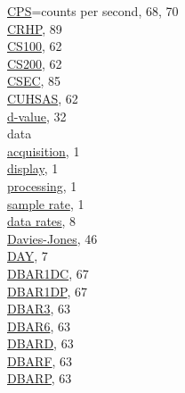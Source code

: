 \documentclass[
]{book}
\begin{document}
\href{./5-cloud-physics-variables.html\#a1dc-a1dp}{CPS}=counts per second, 68, 70\\
\href{./10-obsolete-variables.html\#cryo-hygro}{CRHP}, 89\\
\href{./5-cloud-physics-variables.html\#size-distribution}{CS100}, 62\\
\href{./5-cloud-physics-variables.html\#size-distribution}{CS200}, 62\\
\href{./10-obsolete-variables.html\#loranc}{CSEC}, 85\\
\href{./5-cloud-physics-variables.html\#size-distribution}{CUHSAS}, 62\\
\href{./4-the-state-of-the-atmosphere.html\#dvalue}{d-value}, 32\\
data\\
\hspace*{0.333em}\hspace*{0.333em}\href{./1-introduction.html}{acquisition}, 1\\
\hspace*{0.333em}\hspace*{0.333em}\href{./1-introduction.html}{display}, 1\\
\hspace*{0.333em}\hspace*{0.333em}\href{./1-introduction.html}{processing}, 1\\
\hspace*{0.333em}\hspace*{0.333em}\href{./1-introduction.html}{sample rate}, 1\\
\href{./1-introduction.html}{data rates}, 8\\
\href{./4-the-state-of-the-atmosphere.html\#thetae}{Davies-Jones}, 46\\
\href{./2-general-information-about-data-files.html\#mdy\%7C}{DAY}, 7\\
\href{./5-cloud-physics-variables.html\#dbar2d}{DBAR1DC}, 67\\
\href{./5-cloud-physics-variables.html\#dbar2d}{DBAR1DP}, 67\\
\href{./5-cloud-physics-variables.html\#mean-diameter}{DBAR3}, 63\\
\href{./5-cloud-physics-variables.html\#mean-diameter}{DBAR6}, 63\\
\href{./5-cloud-physics-variables.html\#mean-diameter}{DBARD}, 63\\
\href{./5-cloud-physics-variables.html\#mean-diameter}{DBARF}, 63\\
\href{./5-cloud-physics-variables.html\#mean-diameter}{DBARP}, 63\\
\end{document}
